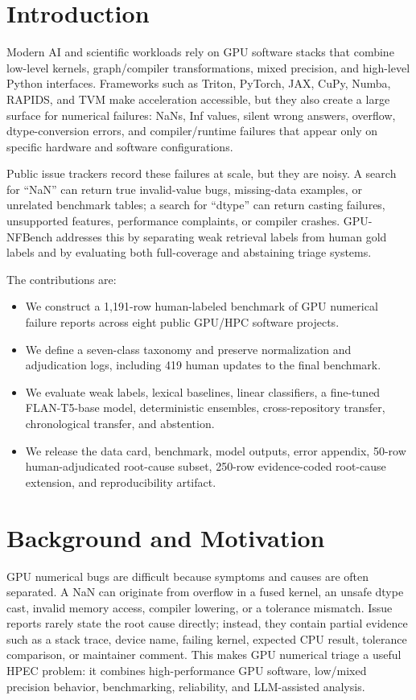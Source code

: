 \documentclass[conference]{IEEEtran}
\newcommand{\bench}{GPU-NFBench}
\begin{document}
\section{Introduction}

Modern AI and scientific workloads rely on GPU software stacks that combine
low-level kernels, graph/compiler transformations, mixed precision, and
high-level Python interfaces. Frameworks such as Triton, PyTorch, JAX, CuPy,
Numba, RAPIDS, and TVM make acceleration accessible, but they also create a
large surface for numerical failures: NaNs, Inf values, silent wrong answers,
overflow, dtype-conversion errors, and compiler/runtime failures that appear
only on specific hardware and software configurations.

Public issue trackers record these failures at scale, but they are noisy. A
search for ``NaN'' can return true invalid-value bugs, missing-data examples,
or unrelated benchmark tables; a search for ``dtype'' can return casting
failures, unsupported features, performance complaints, or compiler crashes.
\bench{} addresses this by separating weak retrieval labels from human gold
labels and by evaluating both full-coverage and abstaining triage systems.

The contributions are:
\begin{itemize}
    \item We construct a 1,191-row human-labeled benchmark of GPU numerical
    failure reports across eight public GPU/HPC software projects.
    \item We define a seven-class taxonomy and preserve normalization and
    adjudication logs, including 419 human updates to the final benchmark.
    \item We evaluate weak labels, lexical baselines, linear classifiers, a
    fine-tuned FLAN-T5-base model, deterministic ensembles, cross-repository
    transfer, chronological transfer, and abstention.
    \item We release the data card, benchmark, model outputs, error appendix,
    50-row human-adjudicated root-cause subset, 250-row evidence-coded
    root-cause extension, and reproducibility artifact.
\end{itemize}

\section{Background and Motivation}

GPU numerical bugs are difficult because symptoms and causes are often
separated. A NaN can originate from overflow in a fused kernel, an unsafe dtype
cast, invalid memory access, compiler lowering, or a tolerance mismatch. Issue
reports rarely state the root cause directly; instead, they contain partial
evidence such as a stack trace, device name, failing kernel, expected CPU
result, tolerance comparison, or maintainer comment. This makes GPU numerical
triage a useful HPEC problem: it combines high-performance GPU software,
low/mixed precision behavior, benchmarking, reliability, and LLM-assisted
analysis.
\end{document}
